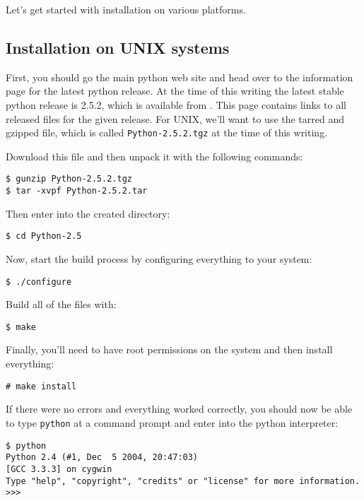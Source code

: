 \documentclass{article}
\begin{document}
Let's get started with installation on various platforms.

\subsection{Installation on UNIX systems}

First, you should go the main python web site and head over to the information
page for the latest python release. At the time of this writing the
latest stable python release is 2.5.2, which is available from
. This page contains links
to all released files for the given release. For UNIX, we'll want to use
the tarred and gzipped file, which is called \verb|Python-2.5.2.tgz| at
the time of this writing.

Download this file and then unpack it with the following commands:

\begin{verbatim}
$ gunzip Python-2.5.2.tgz 
$ tar -xvpf Python-2.5.2.tar 
\end{verbatim}

Then enter into the created directory:

\begin{verbatim}
$ cd Python-2.5
\end{verbatim}

Now, start the build process by configuring everything to your system:

\begin{verbatim}
$ ./configure
\end{verbatim}

Build all of the files with:

\begin{verbatim}
$ make
\end{verbatim}

Finally, you'll need to have root permissions on the system and then
install everything:

\begin{verbatim}
# make install
\end{verbatim}

If there were no errors and everything worked correctly, you should now
be able to type \verb|python| at a command prompt and enter into the
python interpreter:

\begin{verbatim}
$ python
Python 2.4 (#1, Dec  5 2004, 20:47:03)
[GCC 3.3.3] on cygwin
Type "help", "copyright", "credits" or "license" for more information.
>>>
\end{verbatim}
\end{document}
